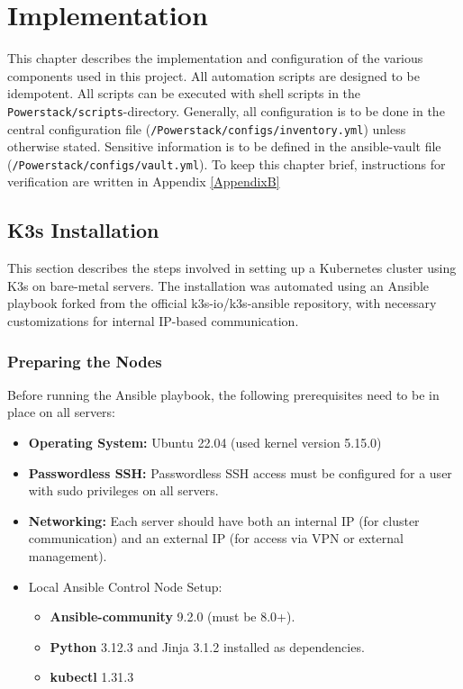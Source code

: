 
\chapter{Implementation} %
\label{Chapter3}

This chapter describes the implementation and configuration of the various components used in this project. All automation scripts are designed to be idempotent. All scripts can be executed with shell scripts in the \texttt{Powerstack/scripts}-directory. Generally, all configuration is to be done in the central configuration file (\texttt{/Powerstack/configs/inventory.yml}) unless otherwise stated. Sensitive information is to be defined in the ansible-vault file\\(\texttt{/Powerstack/configs/vault.yml}). To keep this chapter brief, instructions for verification are written in Appendix \ref{AppendixB}

\section{K3s Installation}

This section describes the steps involved in setting up a Kubernetes cluster using K3s on bare-metal servers. The installation was automated using an Ansible playbook forked from the official k3s-io/k3s-ansible \parencite{k3s-ansible} repository, with necessary customizations for internal IP-based communication.
\subsection{Preparing the Nodes}

Before running the Ansible playbook, the following prerequisites need to be in place on all servers:

\begin{itemize}
    \item \textbf{Operating System:} Ubuntu 22.04 (used kernel version 5.15.0)
    \item \textbf{Passwordless SSH:} Passwordless SSH access must be configured for a user with sudo privileges on all servers.
    \item \textbf{Networking:} Each server should have both an internal IP (for cluster communication) and an external IP (for access via VPN or external management).
    \item Local Ansible Control Node Setup:
    \begin{itemize}
        \item \textbf{Ansible-community} 9.2.0 (must be 8.0+).
        \item \textbf{Python} 3.12.3 and Jinja 3.1.2 installed as dependencies.
        \item \textbf{kubectl} 1.31.3
    \end{itemize}
\end{itemize}

